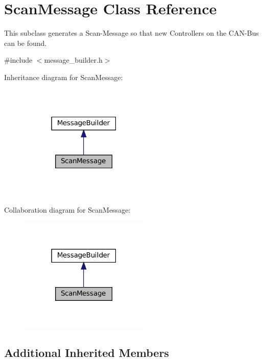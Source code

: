 \hypertarget{classScanMessage}{}\section{Scan\+Message Class Reference}
\label{classScanMessage}


This subclass generates a Scan-\/\+Message so that new Controllers on the C\+A\+N-\/\+Bus can be found.  




{\ttfamily \#include $<$message\+\_\+builder.\+h$>$}



Inheritance diagram for Scan\+Message\+:
\nopagebreak
\begin{figure}[H]
\begin{center}
\leavevmode
\includegraphics[width=174pt]{classScanMessage__inherit__graph}
\end{center}
\end{figure}


Collaboration diagram for Scan\+Message\+:
\nopagebreak
\begin{figure}[H]
\begin{center}
\leavevmode
\includegraphics[width=174pt]{classScanMessage__coll__graph}
\end{center}
\end{figure}
\subsection*{Additional Inherited Members}


